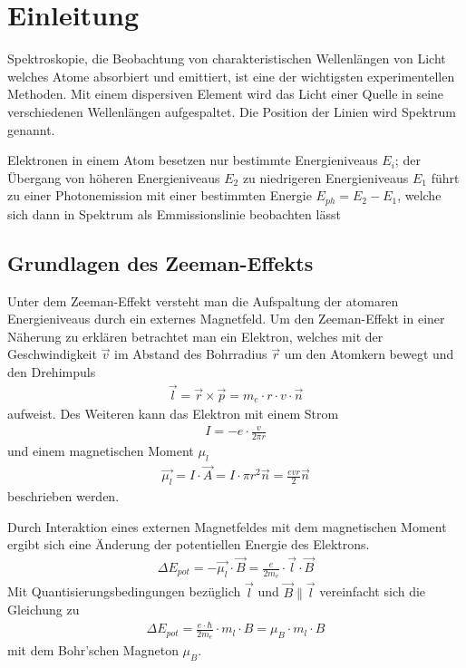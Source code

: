 \section{Einleitung}

  Spektroskopie, die Beobachtung von charakteristischen Wellenlängen von Licht welches Atome absorbiert und emittiert, ist eine der wichtigsten experimentellen Methoden. Mit einem dispersiven Element wird das Licht einer Quelle in seine verschiedenen Wellenlängen aufgespaltet. Die Position der Linien wird Spektrum genannt.

  Elektronen in einem Atom besetzen nur bestimmte Energieniveaus $E_i$; der Übergang von höheren Energieniveaus $E_2$ zu niedrigeren Energieniveaus $E_1$ führt zu einer Photonemission mit einer bestimmten Energie $E_{ph} = E_2 - E_1$, welche sich dann in Spektrum als Emmissionslinie beobachten lässt

  \subsection{Grundlagen des Zeeman-Effekts}
    Unter dem Zeeman-Effekt versteht man die Aufspaltung der atomaren Energieniveaus durch ein externes Magnetfeld. Um den Zeeman-Effekt in einer Näherung zu erklären betrachtet man ein Elektron, welches mit der Geschwindigkeit $\vec{v}$ im Abstand des Bohrradius $\vec{r}$ um den Atomkern bewegt und den Drehimpuls
    \begin{align}
    	\vec{l} = \vec{r} \times \vec{p} = m_e \cdot r \cdot v \cdot \vec{n}
    \end{align}
    aufweist. Des Weiteren kann das Elektron mit einem Strom
    \begin{align}
    	I = -e \cdot \frac{v}{2 \pi r}
    \end{align}
    und einem magnetischen Moment $\mu_l$
    \begin{align}
    	\vec{\mu_l} = I \cdot \vec{A} = I \cdot \pi r^2 \vec{n} = \frac{evr}{2}\vec{n}
    \end{align}
    beschrieben werden.

    Durch Interaktion eines externen Magnetfeldes mit dem magnetischen Moment ergibt sich eine Änderung der potentiellen Energie des Elektrons.
    \begin{align}
    	\Delta E_{pot} = - \vec{\mu_l} \cdot \vec{B} = \frac{e}{2m_e} \cdot \vec{l} \cdot \vec{B}
    \end{align}
    Mit Quantisierungsbedingungen bezüglich $\vec{l}$ und $\vec{B} \parallel \vec{l}$ vereinfacht sich die Gleichung zu
    \begin{align}
    	\Delta E_{pot} = \frac{e \cdot \hbar}{2m_e} \cdot m_l \cdot B = \mu_B \cdot m_l \cdot B
      \label{fml::3}
    \end{align}
    mit dem Bohr'schen Magneton $\mu_B$.

